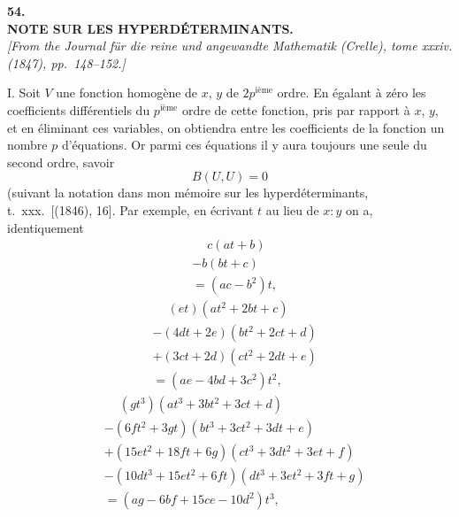 \documentclass[11pt]{article}
\begin{document}
\bigskip

\begin{center}
\textbf{\large 54.}\\[0.7em]
\textbf{\large NOTE SUR LES HYPERD\'ETERMINANTS.}\\[0.5em]
\textit{[From the Journal f\"ur die reine und angewandte Mathematik (Crelle), tome xxxiv.\\
(1847), pp.~148--152.]}
\end{center}

\medskip

\noindent\textsc{I.} Soit $V$ une fonction homog\`ene de $x$, $y$ de $2 p^{\text{i\`eme}}$ ordre. En \'egalant \`a z\'ero les
coefficients diff\'erentiels du $p^{\text{i\`eme}}$ ordre de cette fonction, pris par rapport \`a $x$, $y$, et en
\'eliminant ces variables, on obtiendra entre les coefficients de la fonction un nombre $p$
d'\'equations. Or parmi ces \'equations il y aura toujours une seule du second ordre, savoir
\[
B(U, U) = 0
\]
(suivant la notation dans mon m\'emoire sur les hyperd\'eterminants, t.~xxx.\ [(1846), 16].
Par exemple, en \'ecrivant $t$ au lieu de $x : y$ on a, identiquement
\[
\begin{aligned}
&\phantom{+} c(a t + b)\\
&- b(b t + c)\\
&= (a c - b^{2}) t,
\end{aligned}
\]
\[
\begin{aligned}
&\phantom{+} (e t)(a t^{2} + 2 b t + c)\\
&- (4 d t + 2 e)(b t^{2} + 2 c t + d)\\
&+ (3 c t + 2 d)(c t^{2} + 2 d t + e)\\
&= (a e - 4 b d + 3 c^{2}) t^{2},
\end{aligned}
\]
\[
\begin{aligned}
&\phantom{+} (g t^{3})(a t^{3} + 3 b t^{2} + 3 c t + d)\\
&- (6 f t^{2} + 3 g t)(b t^{3} + 3 c t^{2} + 3 d t + e)\\
&+ (15 e t^{2} + 18 f t + 6 g)(c t^{3} + 3 d t^{2} + 3 e t + f)\\
&- (10 d t^{3} + 15 e t^{2} + 6 f t)(d t^{3} + 3 e t^{2} + 3 f t + g)\\
&= (a g - 6 b f + 15 c e - 10 d^{2}) t^{3},
\end{aligned}
\]
\end{document}
